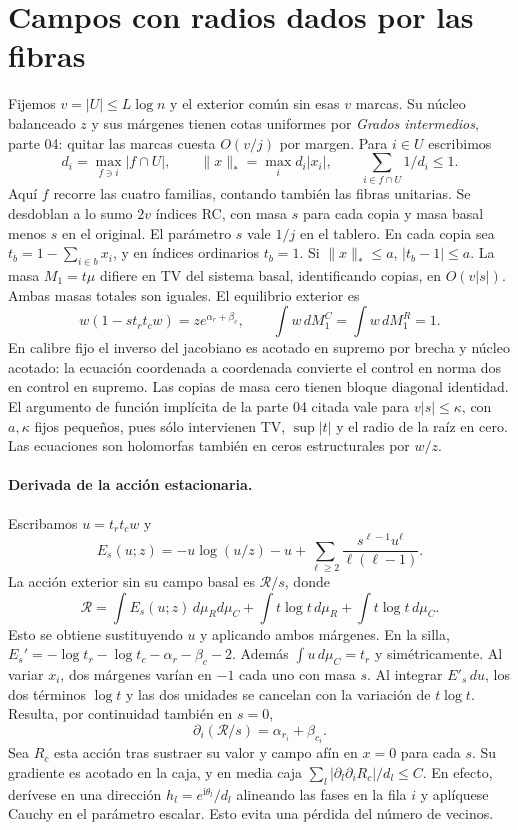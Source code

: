 \section{Campos con radios dados por las fibras}
Fijemos $v=|U|\le L\log n$ y el exterior común sin esas $v$ marcas. Su núcleo balanceado
$z$ y sus márgenes tienen cotas uniformes por \emph{Grados intermedios}, parte 04:
quitar las marcas cuesta $O(v/j)$ por margen. Para $i\in U$ escribimos
\[
 d_i=\max_{f\ni i}|f\cap U|,\qquad
 \|x\|_*=\max_i d_i |x_i|,\qquad \sum_{i\in f\cap U}1/d_i\le1 .
\]
Aquí $f$ recorre las cuatro familias, contando también las fibras unitarias.
Se desdoblan a lo sumo $2v$ índices RC, con masa $s$ para cada copia y masa basal
menos $s$ en el original. El parámetro $s$ vale $1/j$ en el tablero. En cada copia
sea $t_b=1-\sum_{i\in b}x_i$, y en índices ordinarios $t_b=1$. Si $\|x\|_*\le a$,
$|t_b-1|\le a$. La masa $M_1=t\mu$ difiere en TV del sistema basal, identificando
copias, en $O(v|s|)$. Ambas masas totales son iguales. El equilibrio exterior es
\[
 w(1-st_rt_c w)=z e^{\alpha_r+\beta_c},\qquad
 \int w\,dM_1^C=\int w\,dM_1^R=1 .
\]
En calibre fijo el inverso del jacobiano es acotado en supremo por brecha y núcleo
acotado: la ecuación coordenada a coordenada convierte el control en norma dos en
control en supremo. Las copias de masa cero tienen bloque diagonal identidad.
El argumento de función implícita de la parte 04 citada vale para $v|s|\le\kappa$,
con $a,\kappa$ fijos pequeños, pues sólo intervienen TV, $\sup|t|$ y el radio de
la raíz en cero. Las ecuaciones son holomorfas también en ceros estructurales por $w/z$.
\paragraph{Derivada de la acción estacionaria.}
Escribamos $u=t_rt_cw$ y
\[
 E_s(u;z)=-u\log(u/z)-u+\sum_{\ell\ge2}\frac{s^{\ell-1}u^\ell}{\ell(\ell-1)}.
\]
La acción exterior sin su campo basal es $\mathcal R/s$, donde
\[
 \mathcal R=\int E_s(u;z)\,d\mu_R d\mu_C+
        \int t\log t\,d\mu_R+\int t\log t\,d\mu_C .
\]
Esto se obtiene sustituyendo $u$ y aplicando ambos márgenes. En la silla,
$E_s'=-\log t_r-\log t_c-\alpha_r-\beta_c-2$. Además $\int u\,d\mu_C=t_r$
y simétricamente. Al variar $x_i$, dos márgenes varían en $-1$ cada uno con masa $s$.
Al integrar $E'_s\,du$, los dos términos $\log t$ y las dos unidades se cancelan
con la variación de $t\log t$. Resulta, por continuidad también en $s=0$,
\[
 \partial_i(\mathcal R/s)=\alpha_{r_i}+\beta_{c_i}.
\]
Sea $R_c$ esta acción tras sustraer su valor y campo afín en $x=0$ para cada $s$.
Su gradiente es acotado en la caja, y en media caja
$\sum_l|\partial_l\partial_i R_c|/d_l\le C$. En efecto, derívese en una dirección
$h_l=e^{\mathrm i\theta_l}/d_l$ alineando las fases en la fila $i$ y aplíquese
Cauchy en el parámetro escalar. Esto evita una pérdida del número de vecinos.
